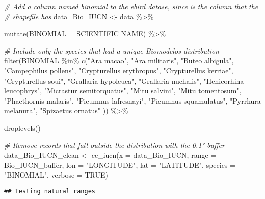 \documentclass[
]{article}
\newenvironment{Shaded}{\begin{snugshade}}{\end{snugshade}}
\newcommand{\AttributeTok}[1]{\textcolor[rgb]{0.77,0.63,0.00}{#1}}
\newcommand{\CommentTok}[1]{\textcolor[rgb]{0.56,0.35,0.01}{\textit{#1}}}
\newcommand{\ConstantTok}[1]{\textcolor[rgb]{0.00,0.00,0.00}{#1}}
\newcommand{\FunctionTok}[1]{\textcolor[rgb]{0.00,0.00,0.00}{#1}}
\newcommand{\NormalTok}[1]{#1}
\newcommand{\OtherTok}[1]{\textcolor[rgb]{0.56,0.35,0.01}{#1}}
\newcommand{\SpecialCharTok}[1]{\textcolor[rgb]{0.00,0.00,0.00}{#1}}
\newcommand{\StringTok}[1]{\textcolor[rgb]{0.31,0.60,0.02}{#1}}
\begin{document}
\begin{Shaded}
\begin{Highlighting}[]
\CommentTok{\# Add a column named binomial to the ebird datase, since is the column that the }
\CommentTok{\# shapefile has }
\NormalTok{data\_Bio\_IUCN }\OtherTok{\textless{}{-}}\NormalTok{ data }\SpecialCharTok{\%\textgreater{}\%} 
  
  \FunctionTok{mutate}\NormalTok{(}\AttributeTok{BINOMIAL =} \StringTok{\textasciigrave{}}\AttributeTok{SCIENTIFIC NAME}\StringTok{\textasciigrave{}}\NormalTok{) }\SpecialCharTok{\%\textgreater{}\%}
  
  \CommentTok{\# Include only the species that had a unique Biomodelos distribution}
  \FunctionTok{filter}\NormalTok{(BINOMIAL }\SpecialCharTok{\%in\%} \FunctionTok{c}\NormalTok{(}\StringTok{"Ara macao"}\NormalTok{, }\StringTok{"Ara militaris"}\NormalTok{, }\StringTok{"Buteo albigula"}\NormalTok{, }\StringTok{"Campephilus pollens"}\NormalTok{, }\StringTok{"Crypturellus erythropus"}\NormalTok{, }\StringTok{"Crypturellus kerriae"}\NormalTok{,   }
 \StringTok{"Crypturellus soui"}\NormalTok{, }\StringTok{"Grallaria hypoleuca"}\NormalTok{, }\StringTok{"Grallaria nuchalis"}\NormalTok{,     }
\StringTok{"Henicorhina leucophrys"}\NormalTok{, }\StringTok{"Micrastur semitorquatus"}\NormalTok{, }\StringTok{"Mitu salvini"}\NormalTok{,            }
\StringTok{"Mitu tomentosum"}\NormalTok{, }\StringTok{"Phaethornis malaris"}\NormalTok{,  }\StringTok{"Picumnus lafresnayi"}\NormalTok{,    }
\StringTok{"Picumnus squamulatus"}\NormalTok{, }\StringTok{"Pyrrhura melanura"}\NormalTok{, }\StringTok{"Spizaetus ornatus"}\NormalTok{ )) }\SpecialCharTok{\%\textgreater{}\%}
  
  \FunctionTok{droplevels}\NormalTok{()}

\CommentTok{\# Remove records that fall outside the distribution with the 0.1° buffer }
\NormalTok{data\_Bio\_IUCN\_clean }\OtherTok{\textless{}{-}} \FunctionTok{cc\_iucn}\NormalTok{(}\AttributeTok{x =}\NormalTok{ data\_Bio\_IUCN, }
                \AttributeTok{range =}\NormalTok{ Bio\_IUCN\_buffer, }
                \AttributeTok{lon =} \StringTok{"LONGITUDE"}\NormalTok{, }
                \AttributeTok{lat =} \StringTok{"LATITUDE"}\NormalTok{,}
                \AttributeTok{species =} \StringTok{"BINOMIAL"}\NormalTok{,}
                \AttributeTok{verbose =} \ConstantTok{TRUE}\NormalTok{)}
\end{Highlighting}
\end{Shaded}

\begin{verbatim}
## Testing natural ranges
\end{verbatim}
\end{document}

